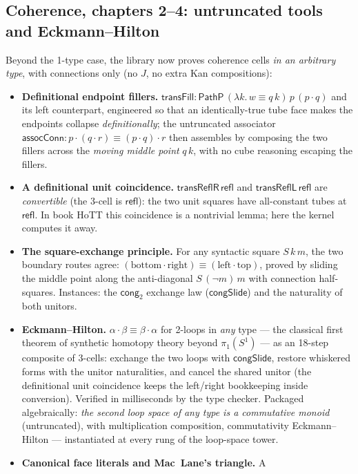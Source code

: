 \documentclass[11pt]{article}
\newcommand{\op}[1]{\ensuremath{\mathsf{#1}}}
\begin{document}
\subsection{Coherence, chapters 2--4: untruncated tools and
Eckmann--Hilton}
Beyond the 1-type case, the library now proves coherence cells
\emph{in an arbitrary type}, with connections only (no $J$, no extra
Kan compositions):
\begin{itemize}[leftmargin=1.5em]
\item \textbf{Definitional endpoint fillers.}
  $\op{transFill} : \op{PathP}\,(\lambda k.\,w \equiv q\,k)\,p\,(p
  \cdot q)$ and its left counterpart, engineered so that an
  identically-true tube face makes the endpoints collapse
  \emph{definitionally}; the untruncated associator
  $\op{assocConn} : p\cdot(q\cdot r) \equiv (p\cdot q)\cdot r$
  then assembles by composing the two fillers across the \emph{moving
  middle point} $q\,k$, with no cube reasoning escaping the fillers.
\item \textbf{A definitional unit coincidence.}
  $\op{transReflR}\,\op{refl}$ and $\op{transReflL}\,\op{refl}$ are
  \emph{convertible} (the 3-cell is $\op{refl}$): the two unit squares
  have all-constant tubes at $\op{refl}$.  In book HoTT this coincidence
  is a nontrivial lemma; here the kernel computes it away.
\item \textbf{The square-exchange principle.}  For any syntactic square
  $S\,k\,m$, the two boundary routes agree:
  $(\mathrm{bottom}\cdot\mathrm{right}) \equiv
  (\mathrm{left}\cdot\mathrm{top})$, proved by sliding the middle
  point along the anti-diagonal $S\,(\neg m)\,m$ with connection
  half-squares.  Instances: the $\op{cong}_2$ exchange law
  ($\op{congSlide}$) and the naturality of both unitors.
\item \textbf{Eckmann--Hilton.}  $\alpha \cdot \beta \equiv \beta
  \cdot \alpha$ for 2-loops in \emph{any} type --- the classical first
  theorem of synthetic homotopy theory beyond $\pi_1(S^1)$ --- as an
  18-step composite of 3-cells: exchange the two loops with
  $\op{congSlide}$, restore whiskered forms with the unitor
  naturalities, and cancel the shared unitor (the definitional unit
  coincidence keeps the left/right bookkeeping inside conversion).
  Verified in milliseconds by the type checker.  Packaged
  algebraically: \emph{the second loop space of any type is a
  commutative monoid} (untruncated), with multiplication composition,
  commutativity Eckmann--Hilton — instantiated at every rung of the
  loop-space tower.
\item \textbf{Canonical face literals and Mac~Lane's triangle.}  A

\end{itemize}
\end{document}
